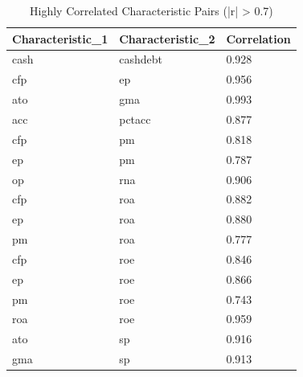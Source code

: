 \begin{table}[ht]
\centering
\caption{Highly Correlated Characteristic Pairs (|r| > 0.7)} 
\label{tab:high_correlations}
\begin{tabular}{lll}
  \hline
Characteristic\_1 & Characteristic\_2 & Correlation \\ 
  \hline
cash & cashdebt & 0.928 \\ 
  cfp & ep & 0.956 \\ 
  ato & gma & 0.993 \\ 
  acc & pctacc & 0.877 \\ 
  cfp & pm & 0.818 \\ 
  ep & pm & 0.787 \\ 
  op & rna & 0.906 \\ 
  cfp & roa & 0.882 \\ 
  ep & roa & 0.880 \\ 
  pm & roa & 0.777 \\ 
  cfp & roe & 0.846 \\ 
  ep & roe & 0.866 \\ 
  pm & roe & 0.743 \\ 
  roa & roe & 0.959 \\ 
  ato & sp & 0.916 \\ 
  gma & sp & 0.913 \\ 
   \hline
\end{tabular}
\end{table}
